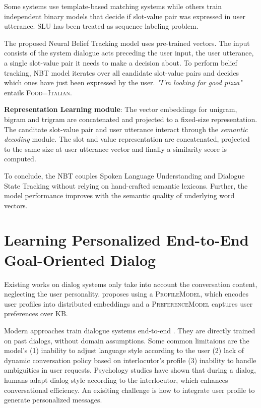 \documentclass[11pt,a4paper]{article}
\begin{document}
Some systems use template-based matching systems while others train independent binary models that decide if slot-value pair was expressed in user utterance. SLU has been treated as sequence labeling problem.

The proposed Neural Belief Tracking model uses pre-trained vectors. The input consists of the system dialogue acts preceding the user input, the user utterance, a single slot-value pair it needs to make a decision about. To perform belief tracking, NBT model iterates over all candidate slot-value pairs and decides which ones have just been expressed by the user. \textit{"I'm looking for good pizza"} entails \textsc{Food=Italian}.

\smallskip \noindent \textbf{Representation Learning module}:
The vector embeddings for unigram, bigram and trigram are concatenated and projected to a fixed-size representation. The canditate slot-value pair and user utterance interact through the \textit{semantic decoding} module. The slot and value representation are concatenated, projected to the same size at user utterance vector and finally a similarity score is computed.

To conclude, the NBT couples Spoken Language Understanding and Dialogue State Tracking without relying on hand-crafted semantic lexicons. Further, the model performance improves with the semantic quality of underlying word vectors.

\section{Learning Personalized End-to-End Goal-Oriented Dialog}


Existing works on dialog systems only take into account the conversation content, neglecting the user personality. \cite{Luo2019LearningPE} proposes using a \textsc{ProfileModel}, which encodes user profiles into distributed embeddings and a \textsc{PreferenceModel} captures user preferences over KB. 

Modern approaches train dialogue systems end-to-end \cite{Vinyals2015ANC, Sukhbaatar2015EndToEndMN}. They are directly trained on past dialogs, without domain assumptions. Some common limitaions are the model's (1) inability to adjust language style according to the user (2) lack of dynamic conversation policy based on interlocutor's profile (3) inability to handle ambiguities in user requests. Psychology studies have shown that during a dialog, humans adapt dialog style according to the interlocutor, which enhances conversational efficiency. An exisiting challenge is how to integrate user profile to generate personalized messages.
\end{document}

